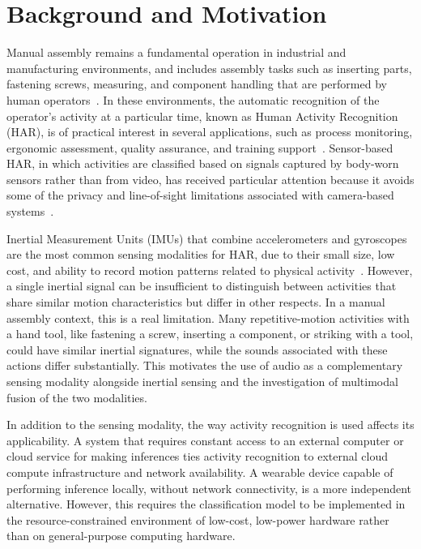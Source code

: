 \section{Background and Motivation}
Manual assembly remains a fundamental operation in industrial and manufacturing environments, and includes assembly tasks such as inserting parts, fastening screws, measuring, and component handling that are performed by human operators~\cite{alamin2019action}. In these environments, the automatic recognition of the operator's activity at a particular time, known as Human Activity Recognition (HAR), is of practical interest in several applications, such as process monitoring, ergonomic assessment, quality assurance, and training support~\cite{stiefmeier2008wearable, reining2019har, alamin2019action}. Sensor-based HAR, in which activities are classified based on signals captured by body-worn sensors rather than from video, has received particular attention because it avoids some of the privacy and line-of-sight limitations associated with camera-based systems~\cite{alamin2019action, kumar2024har}.

Inertial Measurement Units (IMUs) that combine accelerometers and gyroscopes are the most common sensing modalities for HAR, due to their small size, low cost, and ability to record motion patterns related to physical activity~\cite{bulling2014tutorial, kumar2024har}. However, a single inertial signal can be insufficient to distinguish between activities that share similar motion characteristics but differ in other respects. In a manual assembly context, this is a real limitation. Many repetitive-motion activities with a hand tool, like fastening a screw, inserting a component,  or striking with a tool, could have similar inertial signatures, while the sounds associated with these actions differ substantially. This motivates the use of audio as a complementary sensing modality alongside inertial sensing and the investigation of multimodal fusion of the two modalities.

In addition to the sensing modality, the way activity recognition is used affects its applicability. A system that requires constant access to an external computer or cloud service for making inferences ties activity recognition to external cloud compute infrastructure and network availability. A wearable device capable of performing inference locally, without network connectivity, is a more independent alternative. However, this requires the classification model to be implemented in the resource-constrained environment of low-cost, low-power hardware rather than on general-purpose computing hardware.

